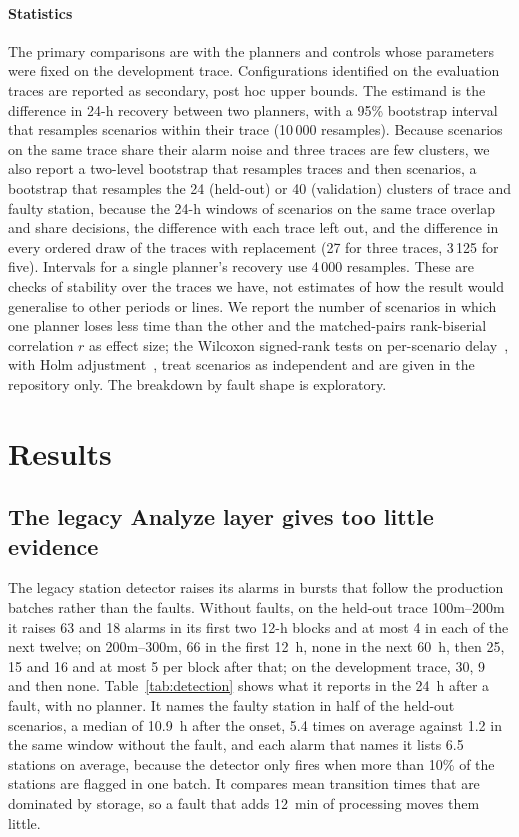 \documentclass[preprint,11pt]{elsarticle}
\begin{document}
\paragraph{Statistics}
The primary comparisons are with the planners and controls whose parameters were fixed on the development trace. Configurations identified on the evaluation traces are reported as secondary, post hoc upper bounds. The estimand is the difference in 24-h recovery between two planners, with a 95\% bootstrap interval~\cite{efron1993bootstrap} that resamples scenarios within their trace (10\,000 resamples). Because scenarios on the same trace share their alarm noise and three traces are few clusters, we also report a two-level bootstrap that resamples traces and then scenarios, a bootstrap that resamples the 24 (held-out) or 40 (validation) clusters of trace and faulty station, because the 24-h windows of scenarios on the same trace overlap and share decisions, the difference with each trace left out, and the difference in every ordered draw of the traces with replacement (27 for three traces, 3\,125 for five). Intervals for a single planner's recovery use 4\,000 resamples. These are checks of stability over the traces we have, not estimates of how the result would generalise to other periods or lines. We report the number of scenarios in which one planner loses less time than the other and the matched-pairs rank-biserial correlation $r$ as effect size; the Wilcoxon signed-rank tests on per-scenario delay~\cite{wilcoxon1945}, with Holm adjustment~\cite{holm1979}, treat scenarios as independent and are given in the repository only. The breakdown by fault shape is exploratory.

\section{Results}
\label{sec:results}

\subsection{The legacy Analyze layer gives too little evidence}
\label{sec:legacy}
The legacy station detector raises its alarms in bursts that follow the production batches rather than the faults. Without faults, on the held-out trace 100m--200m it raises 63 and 18 alarms in its first two 12-h blocks and at most 4 in each of the next twelve; on 200m--300m, 66 in the first 12~h, none in the next 60~h, then 25, 15 and 16 and at most 5 per block after that; on the development trace, 30, 9 and then none. Table~\ref{tab:detection} shows what it reports in the 24~h after a fault, with no planner. It names the faulty station in half of the held-out scenarios, a median of 10.9~h after the onset, 5.4 times on average against 1.2 in the same window without the fault, and each alarm that names it lists 6.5 stations on average, because the detector only fires when more than 10\% of the stations are flagged in one batch. It compares mean transition times that are dominated by storage, so a fault that adds 12~min of processing moves them little.
\end{document}
